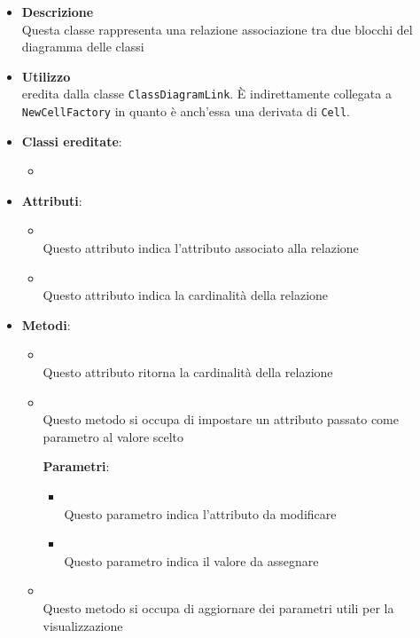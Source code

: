 \label{\nogloxy{swedesigner::client::model::celltypes::class::HxAssociation}}
\begin{itemize}
\item \textbf{Descrizione}\\
Questa classe rappresenta una relazione associazione tra due blocchi del diagramma delle classi
\item \textbf{Utilizzo}\\
eredita dalla classe \texttt{ClassDiagramLink}. È indirettamente collegata a \texttt{NewCellFactory} in quanto è anch'essa una derivata di \texttt{Cell}.
\item \textbf{Classi ereditate}:
\begin{itemize}
\item \hyperref[\nogloxy{swedesigner::client::model::celltypes::class::ClassDiagramLink}]{}
\end{itemize}
\item \textbf{Attributi}:
\begin{itemize}
\item {}
\\ Questo attributo indica l'attributo associato alla relazione
\item {}
\\ Questo attributo indica la cardinalità della relazione
\end{itemize}
\item \textbf{Metodi}:
\begin{itemize}
\item {}
\\ Questo attributo ritorna la cardinalità della relazione
\item {}
\\ Questo metodo si occupa di impostare un attributo passato come parametro al valore scelto

\textbf{Parametri}:
\begin{itemize}
\item {}
\\ Questo parametro indica l'attributo da modificare

\item {}
\\ Questo parametro indica il valore da assegnare

\end{itemize}
\item {}
\\ Questo metodo si occupa di aggiornare dei parametri utili per la visualizzazione
\end{itemize}
\end{itemize}

